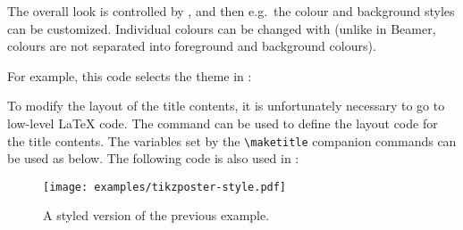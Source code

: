 The overall look is controlled by ,
and then e.g.\ the colour and background styles can be customized.
Individual colours can be changed with 
(unlike in Beamer, colours are not separated into foreground and background colours).

For example, this code selects the theme in :
\begin{ExampleCode}

\end{ExampleCode}

To modify the layout of the title contents,
it is unfortunately necessary to go to low-level \LaTeX{} code.
The  command can be used to define the layout code for the title contents.
The variables set by the \verb|\maketitle| companion commands can be used as below.
The following code is also used in :
%
\begin{ExampleCode}
\settitle{
    \makebox[8cm][c]{\@titlegraphic}
    \parbox[b]{20cm}{
        \color{titlefgcolor} {\bfseries \Huge \sc \@title \par}
        \vspace*{1em}
        {\huge \@author{} \Large (\@institute)}
    }
}
\end{ExampleCode}

\begin{figure}
\centering
\texttt{[image: examples/tikzposter-style.pdf]}
\caption{A styled version of the previous example.}\label{fig:poster styled}
\end{figure}

